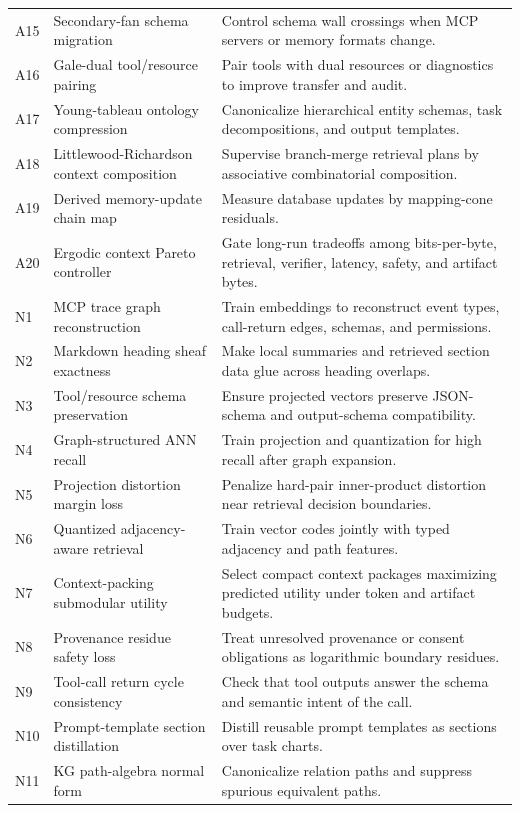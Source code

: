 \documentclass[11pt]{article}
\numberwithin{equation}{section}
\begin{document}
\begin{longtable}{p{}p{}p{}}
A15 & Secondary-fan schema migration & Control schema wall crossings when MCP servers or memory formats change.\\
A16 & Gale-dual tool/resource pairing & Pair tools with dual resources or diagnostics to improve transfer and audit.\\
A17 & Young-tableau ontology compression & Canonicalize hierarchical entity schemas, task decompositions, and output templates.\\
A18 & Littlewood-Richardson context composition & Supervise branch-merge retrieval plans by associative combinatorial composition.\\
A19 & Derived memory-update chain map & Measure database updates by mapping-cone residuals.\\
A20 & Ergodic context Pareto controller & Gate long-run tradeoffs among bits-per-byte, retrieval, verifier, latency, safety, and artifact bytes.\\
N1 & MCP trace graph reconstruction & Train embeddings to reconstruct event types, call-return edges, schemas, and permissions.\\
N2 & Markdown heading sheaf exactness & Make local summaries and retrieved section data glue across heading overlaps.\\
N3 & Tool/resource schema preservation & Ensure projected vectors preserve JSON-schema and output-schema compatibility.\\
N4 & Graph-structured ANN recall & Train projection and quantization for high recall after graph expansion.\\
N5 & Projection distortion margin loss & Penalize hard-pair inner-product distortion near retrieval decision boundaries.\\
N6 & Quantized adjacency-aware retrieval & Train vector codes jointly with typed adjacency and path features.\\
N7 & Context-packing submodular utility & Select compact context packages maximizing predicted utility under token and artifact budgets.\\
N8 & Provenance residue safety loss & Treat unresolved provenance or consent obligations as logarithmic boundary residues.\\
N9 & Tool-call return cycle consistency & Check that tool outputs answer the schema and semantic intent of the call.\\
N10 & Prompt-template section distillation & Distill reusable prompt templates as sections over task charts.\\
N11 & KG path-algebra normal form & Canonicalize relation paths and suppress spurious equivalent paths.\\

\end{longtable}
\end{document}
